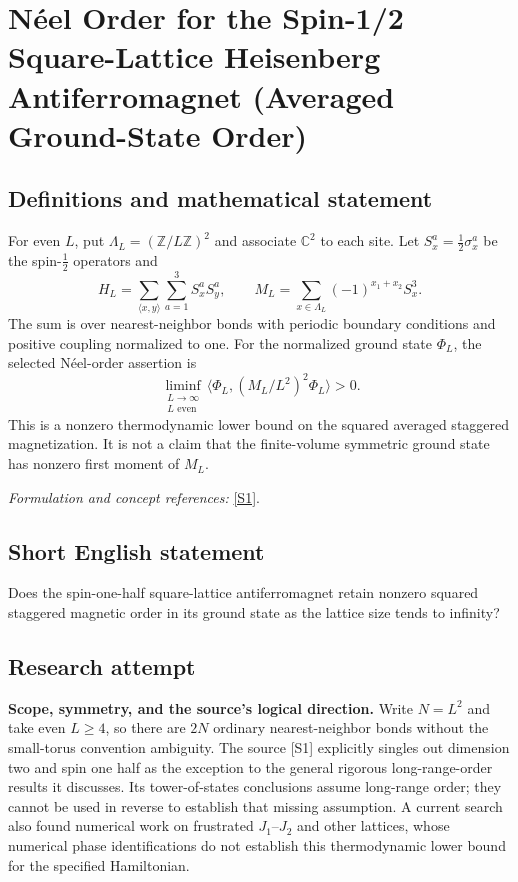 \documentclass[11pt]{article}
\begin{document}
\section*{\texorpdfstring{Néel Order for the Spin-1/2 Square-Lattice Heisenberg Antiferromagnet (Averaged Ground-State Order)}{Néel Order for the Spin-1/2 Square-Lattice Heisenberg Antiferromagnet (Averaged Ground-State Order)}}\label{325}
\subsection{Definitions and mathematical statement}
For even $L$, put $\Lambda_L=({\mathbb{Z}}/L{\mathbb{Z}})^2$ and associate ${\mathbb{C}}^2$ to each site. Let $S_x^a=\frac12\sigma_x^a$ be the spin-$\frac12$ operators and
\[
 H_L=\sum_{\langle x,y\rangle}\sum_{a=1}^3S_x^aS_y^a,
 \qquad M_L=\sum_{x\in\Lambda_L}(-1)^{x_1+x_2}S_x^3.
\]
The sum is over nearest-neighbor bonds with periodic boundary conditions and positive coupling normalized to one. For the normalized ground state $\Phi_L$, the selected N\'eel-order assertion is
\[
 \liminf_{\substack{L\to\infty\\L\text{ even}}}
 \langle\Phi_L,(M_L/L^2)^2\Phi_L\rangle>0.
\]
This is a nonzero thermodynamic lower bound on the squared averaged staggered magnetization. It is not a claim that the finite-volume symmetric ground state has nonzero first moment of $M_L$.
\par\smallskip\textit{Formulation and concept references:} \href{https://arxiv.org/pdf/1807.05847}{[S1]}.

\subsection{Short English statement}
Does the spin-one-half square-lattice antiferromagnet retain nonzero squared staggered magnetic order in its ground state as the lattice size tends to infinity?
\subsection{Research attempt}
\textbf{Scope, symmetry, and the source's logical direction.}
Write $N=L^2$ and take even $L\geq4$, so there are $2N$ ordinary
nearest-neighbor bonds without the small-torus convention ambiguity.
The source [S1] explicitly singles out dimension two and spin one half as the
exception to the general rigorous long-range-order results it discusses.
Its tower-of-states conclusions assume long-range order; they cannot be used
in reverse to establish that missing assumption.  A current search also found
numerical work on frustrated $J_1$--$J_2$ and other lattices, whose numerical
phase identifications do not establish this thermodynamic lower bound for the
specified Hamiltonian.
\end{document}
